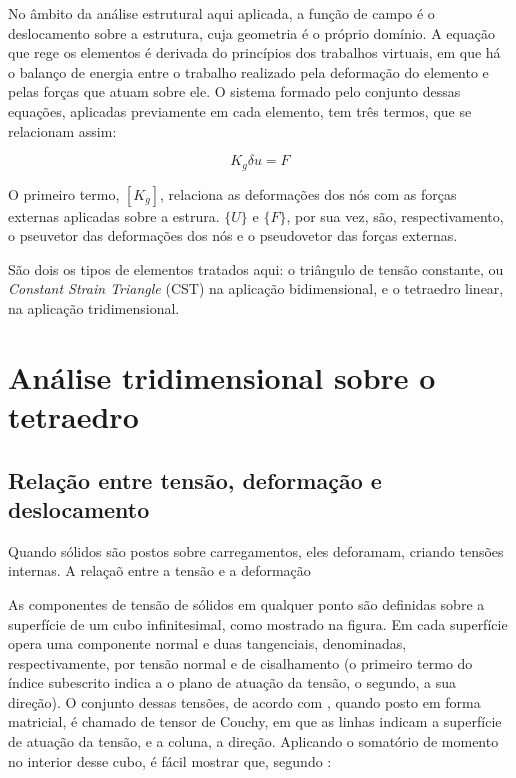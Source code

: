 No âmbito da análise estrutural aqui aplicada, a função de campo é o deslocamento sobre a estrutura, cuja geometria é o próprio domínio. A equação que rege os elementos é derivada do princípios dos trabalhos virtuais, em que há o balanço de energia entre o trabalho realizado pela deformação do elemento e pelas forças que atuam sobre ele. O sistema formado pelo conjunto dessas equações, aplicadas previamente em cada elemento, tem três termos, que se relacionam assim:

\begin{equation} \label{eq:sistema_global}
    K_g \delta u = F
\end{equation}

O primeiro termo, $[K_g]$, relaciona as deformações dos nós com as forças externas aplicadas sobre a estrura. $\{U\}$ e $\{F\}$, por sua vez, são, respectivamento, o pseuvetor das deformações dos nós e o pseudovetor das forças externas.

São dois os tipos de elementos tratados aqui: o triângulo de tensão constante, ou \emph{Constant Strain Triangle} (CST) na aplicação bidimensional, e o tetraedro linear, na aplicação tridimensional.

\section{Análise tridimensional sobre o tetraedro}

\subsection{Relação entre tensão, deformação e deslocamento}

Quando sólidos são postos sobre carregamentos, eles deforamam, criando tensões internas. A relaçaõ entre a tensão e a deformação

As componentes de tensão de sólidos em qualquer ponto são definidas sobre a superfície de um cubo infinitesimal, como mostrado na figura. Em cada superfície opera uma componente normal e duas tangenciais, denominadas, respectivamente, por tensão normal e de cisalhamento (o primeiro termo do índice subescrito indica a o plano de atuação da tensão, o segundo, a sua direção). O conjunto dessas tensões, de acordo com , quando posto em forma matricial, é chamado de tensor de Couchy, em que as linhas indicam a superfície de atuação da tensão, e a coluna, a direção. Aplicando o somatório de momento no interior desse cubo, é fácil mostrar que, segundo :

